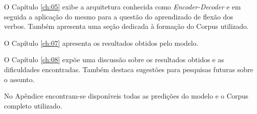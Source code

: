 O Capítulo \ref{ch:05} exibe a arquitetura conhecida como \textit{Encoder-Decoder} e em seguida a aplicação do mesmo para a questão do aprendizado de flexão dos verbos. Também apresenta uma seção dedicada à formação do Corpus utilizado.

O Capítulo \ref{ch:07} apresenta os resultados obtidos pelo modelo.

O Capítulo \ref{ch:08} expõe uma discussão sobre os resultados obtidos e as dificuldades encontradas. Também destaca sugestões para pesquisas futuras sobre o assunto.

No Apêndice encontram-se disponíveis todas as predições do modelo e o Corpus completo utilizado.


